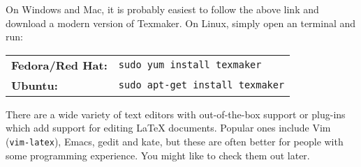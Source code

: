 \documentclass[a4paper]{article}
\begin{document}
On Windows and Mac, it is probably easiest to follow the above link
and download a modern version of Texmaker.
On Linux, simply open an terminal and run:
\begin{center}
\begin{tabular}{ll}
\textbf{Fedora/Red Hat:} & \verb|sudo yum install texmaker| \\
\textbf{Ubuntu:} & \verb|sudo apt-get install texmaker|
\end{tabular}
\end{center}

There are a wide variety of text editors with out-of-the-box
support or plug-ins which add support for editing LaTeX documents.
Popular ones include Vim (\verb|vim-latex|), Emacs, gedit and kate,
but these are often
better for people with some programming experience. You might like
to check them out later.

%  
%  
%  
%  
\end{document}
